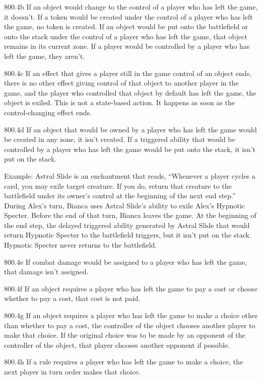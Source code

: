 800.4b If an object would change to the control of a player who has left the game, it doesn’t. If a token would be created under the control of a player who has left the game, no token is created. If an object would be put onto the battlefield or onto the stack under the control of a player who has left the game, that object remains in its current zone. If a player would be controlled by a player who has left the game, they aren’t.

800.4c If an effect that gives a player still in the game control of an object ends, there is no other effect giving control of that object to another player in the game, and the player who controlled that object by default has left the game, the object is exiled. This is not a state-based action. It happens as soon as the control-changing effect ends.

800.4d If an object that would be owned by a player who has left the game would be created in any zone, it isn’t created. If a triggered ability that would be controlled by a player who has left the game would be put onto the stack, it isn’t put on the stack.

Example: Astral Slide is an enchantment that reads, “Whenever a player cycles a card, you may exile target creature. If you do, return that creature to the battlefield under its owner’s control at the beginning of the next end step.” During Alex’s turn, Bianca uses Astral Slide’s ability to exile Alex’s Hypnotic Specter. Before the end of that turn, Bianca leaves the game. At the beginning of the end step, the delayed triggered ability generated by Astral Slide that would return Hypnotic Specter to the battlefield triggers, but it isn’t put on the stack. Hypnotic Specter never returns to the battlefield.

800.4e If combat damage would be assigned to a player who has left the game, that damage isn’t assigned.

800.4f If an object requires a player who has left the game to pay a cost or choose whether to pay a cost, that cost is not paid.

800.4g If an object requires a player who has left the game to make a choice other than whether to pay a cost, the controller of the object chooses another player to make that choice. If the original choice was to be made by an opponent of the controller of the object, that player chooses another opponent if possible.

800.4h If a rule requires a player who has left the game to make a choice, the next player in turn order makes that choice.

